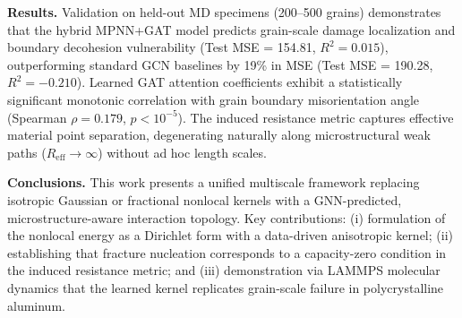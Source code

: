 \documentclass[12pt,a4paper]{article}
\begin{document}
\textbf{Results.} Validation on held-out MD specimens (200--500 grains) demonstrates that the hybrid MPNN+GAT model predicts grain-scale damage localization and boundary decohesion vulnerability (Test MSE = 154.81, $R^2 = 0.015$), outperforming standard GCN baselines by 19\% in MSE (Test MSE = 190.28, $R^2 = -0.210$). Learned GAT attention coefficients exhibit a statistically significant monotonic correlation with grain boundary misorientation angle (Spearman $\rho = 0.179$, $p < 10^{-5}$). The induced resistance metric captures effective material point separation, degenerating naturally along microstructural weak paths ($R_{\text{eff}} \to \infty$) without ad hoc length scales.\par


\textbf{Conclusions.} This work presents a unified multiscale framework replacing isotropic Gaussian or fractional nonlocal kernels with a GNN-predicted, microstructure-aware interaction topology. Key contributions: (i) formulation of the nonlocal energy as a Dirichlet form with a data-driven anisotropic kernel; (ii) establishing that fracture nucleation corresponds to a capacity-zero condition in the induced resistance metric; and (iii) demonstration via LAMMPS molecular dynamics that the learned kernel replicates grain-scale failure in polycrystalline aluminum.\par

\endgroup
\end{document}
